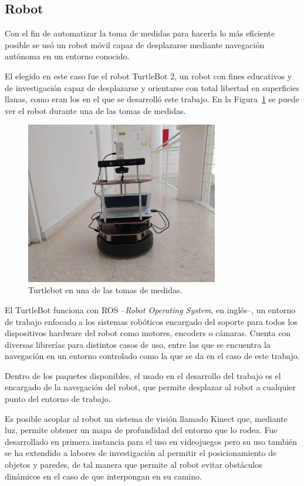 \subsection{Robot}

Con el fin de automatizar la toma de medidas para hacerla lo más eficiente posible se usó un robot móvil capaz de desplazarse mediante navegación autónoma en un entorno conocido.

El elegido en este caso fue el robot TurtleBot 2, un robot con fines educativos y de investigación capaz de desplazarse y orientarse con total libertad en superficies llanas, como eran los en el que se desarrolló este trabajo.
En la Figura~\ref{fig:robot} se puede ver el robot durante una de las tomas de medidas.

\begin{figure}[H]
    \centering
    \includegraphics[width=0.75\textwidth]{pic/robot_fisica.jpg}
    \caption{Turtlebot en una de las tomas de medidas.}
    \label{fig:robot}
\end{figure}

El TurtleBot funciona con ROS --\textit{Robot Operating System}, en inglés--, un entorno de trabajo enfocado a los sistemas robóticos encargado del soporte para todos los dispositivos hardware del robot como motores, encoders o cámaras. 
Cuenta con diversas librerías para distintos casos de uso, entre las que se encuentra la navegación en un entorno controlado como la que se da en el caso de este trabajo.

Dentro de los paquetes disponibles, el usado en el desarrollo del trabajo es el encargado de la navegación del robot, que permite desplazar al robot a cualquier punto del entorno de trabajo.

Es posible acoplar al robot un sistema de visión llamado Kinect que, mediante luz, permite obtener un mapa de profundidad del entorno que lo rodea.
Fue desarrollado en primera instancia para el uso en videojuegos pero su uso también se ha extendido a labores de investigación al permitir el posicionamiento de objetos y paredes, de tal manera que permite al robot evitar obstáculos dinámicos en el caso de que interpongan en su camino.

